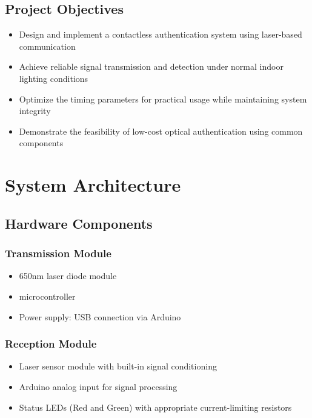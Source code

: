 \documentclass[12pt,a4paper]{article}
\begin{document}
\subsection{Project Objectives}
\begin{itemize}
    \item Design and implement a contactless authentication system using laser-based communication
    \item Achieve reliable signal transmission and detection under normal indoor lighting conditions
    \item Optimize the timing parameters for practical usage while maintaining system integrity
    \item Demonstrate the feasibility of low-cost optical authentication using common components
\end{itemize}

\section{System Architecture}
\subsection{Hardware Components}
\subsubsection{Transmission Module}
\begin{itemize}
    \item 650nm laser diode module
    \item microcontroller
    \item Power supply: USB connection via Arduino
\end{itemize}

\subsubsection{Reception Module}
\begin{itemize}
    \item Laser sensor module with built-in signal conditioning
    \item Arduino analog input for signal processing
    \item Status LEDs (Red and Green) with appropriate current-limiting resistors
\end{itemize}
\end{document}
